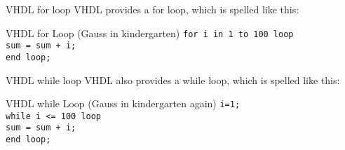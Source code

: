 \begin{frame}{VHDL for loop}
  VHDL provides a for loop, which is spelled like this:
  \begin{block}{VHDL for Loop (Gauss in kindergarten)}
    \texttt{for i in 1 to 100 loop\\ \hspace{24pt} sum = sum + i;\\ end loop;}
  \end{block}
\end{frame}

\begin{frame}{VHDL while loop}
  VHDL also provides a while loop, which is spelled like this:
  \begin{block}{VHDL while Loop (Gauss in kindergarten again)}
    \texttt{i=1;\\ while i <= 100 loop\\ \hspace{24pt} sum = sum + i;\\ end loop;}
  \end{block}
\end{frame}


